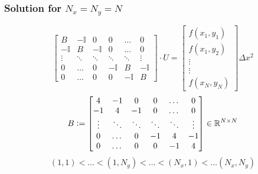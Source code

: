     \subsubsection{Solution for $N_x = N_y = N$}
        \vspace{0.5em}
        $$
                \!\!\!
                \begin{bmatrix}
                    B & -\mathbb{I} &  0 & 0 & \dots & 0 \\
                    -\mathbb{I} &  B & -\mathbb{I} & 0 & \dots & 0 \\
                    \vdots & \ddots & \ddots & \ddots & \ddots & \vdots \\
                    0 & \dots & 0 & -\mathbb{I} &  B & -\mathbb{I} \\
                    0 & \dots & 0 & 0 &  -\mathbb{I} &  B 
                \end{bmatrix}
                \cdot U
                = 
                \!\!
                \begin{bmatrix}
                    f(x_1,y_1) \\ f(x_1,y_2) \\ \vdots \\ \vdots\\ f(x_N,y_N)
                \end{bmatrix}
                \!
                \Delta x^2
            $$
            $$
                B \vcentcolon= 
                \begin{bmatrix}
                    4 & -1 &  0 & 0 & \dots & 0 \\
                    -1 &  4 & -1 & 0 & \dots & 0 \\
                    \vdots & \ddots & \ddots & \ddots & \ddots & \vdots \\
                    0 & \dots & 0 & -1 &  4 & -1 \\
                    0 & \dots & 0 & 0 &  -1 &  4 
                \end{bmatrix}
                \in \mathbb{R}^{N \times N}
            $$
            \vspace{0.5em}
            $$
                (1,1) < \dots < (1,N_y) < \dots < (N_x,1) < \dots (N_x, N_y)
            $$
